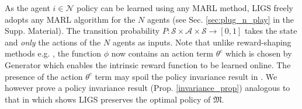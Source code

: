 \documentclass{article}
\begin{document}
 As the agent $i\in\mathcal{N}$ policy can be learned using any MARL method, LIGS freely adopts any MARL algorithm for the $N$ agents (see Sec. \ref{sec:plug_n_play} in the Supp. Material).  The transition probability $P:\mathcal{S}\times\boldsymbol{\mathcal{A}}\times\mathcal{S}\to[0,1]$ takes the state and \textit{only} the actions of the $N$ agents as inputs.
 Note that unlike reward-shaping methods e.g. \cite{ng1999policy}, the function $\phi$ now contains an action term $\theta^c$ which is chosen by {\selectfont Generator} which enables the intrinsic reward function to be learned online. The presence of the action $\theta^c$ term may spoil the policy invariance result in \cite{ng1999policy}. We however prove a policy invariance result (Prop. \ref{invariance_prop}) analogous to that in \cite{ng1999policy} which shows LIGS preserves the optimal policy of $\mathfrak{M}$.
% 
% 
% 
% 
% 
% 
% 
% 
% 
% 
\end{document}
